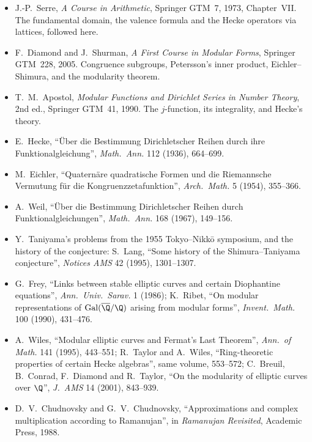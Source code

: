 \begin{itemize}
\item J.-P.~Serre, \emph{A Course in Arithmetic}, Springer GTM~7, 1973, Chapter~VII. The fundamental domain, the valence formula and the Hecke operators via lattices,
followed here.
\item F.~Diamond and J.~Shurman, \emph{A First Course in Modular Forms}, Springer GTM~228, 2005. Congruence subgroups, Petersson's inner product, Eichler--Shimura, and the
modularity theorem.
\item T.~M.~Apostol, \emph{Modular Functions and Dirichlet Series in Number Theory}, 2nd ed., Springer GTM~41, 1990. The $j$-function, its integrality, and Hecke's theory.
\item E.~Hecke, ``\"Uber die Bestimmung Dirichletscher Reihen durch ihre Funktionalgleichung'', \emph{Math.\ Ann.} 112 (1936), 664--699.
\item M.~Eichler, ``Quatern\"are quadratische Formen und die Riemannsche Vermutung f\"ur die Kongruenzzetafunktion'', \emph{Arch.\ Math.} 5 (1954), 355--366.
\item A.~Weil, ``\"Uber die Bestimmung Dirichletscher Reihen durch Funktionalgleichungen'', \emph{Math.\ Ann.} 168 (1967), 149--156.
\item Y.~Taniyama's problems from the 1955 Tokyo--Nikk\=o symposium, and the history of the conjecture: S.~Lang, ``Some history of the Shimura--Taniyama conjecture'',
\emph{Notices AMS} 42 (1995), 1301--1307.
\item G.~Frey, ``Links between stable elliptic curves and certain Diophantine equations'', \emph{Ann.\ Univ.\ Sarav.} 1 (1986); K.~Ribet, ``On modular representations of
$\mathrm{Gal}(\overline{\Q}/\Q)$ arising from modular forms'', \emph{Invent.\ Math.} 100 (1990), 431--476.
\item A.~Wiles, ``Modular elliptic curves and Fermat's Last Theorem'', \emph{Ann.\ of Math.} 141 (1995), 443--551; R.~Taylor and A.~Wiles, ``Ring-theoretic properties of certain
Hecke algebras'', same volume, 553--572; C.~Breuil, B.~Conrad, F.~Diamond and R.~Taylor, ``On the modularity of elliptic curves over $\Q$'', \emph{J.\ AMS} 14 (2001), 843--939.
\item D.~V.~Chudnovsky and G.~V.~Chudnovsky, ``Approximations and complex multiplication according to Ramanujan'', in \emph{Ramanujan Revisited}, Academic Press, 1988.
\end{itemize}
